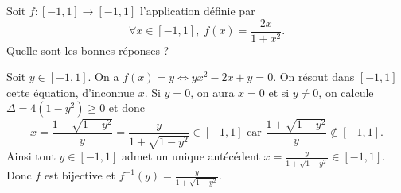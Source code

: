 \begin{question}
Soit $f:[-1,1]\to [-1,1]$ l'application définie par
$$\forall x\in [-1,1],\; f(x)=\frac{2x}{1+x^2}.$$
Quelle sont les bonnes réponses ?
\begin{answers}  
\end{answers}
\begin{explanations}
Soit $y\in [-1,1]$. On a $\displaystyle f(x)=y\Leftrightarrow yx^2-2x+y=0$. On résout dans $[-1,1]$ cette équation, d'inconnue $x$. Si $y=0$, on aura $x=0$ et si $y\neq 0$, on calcule $\Delta =4(1-y^2)\geq 0$ et donc
$$x=\frac{1-\sqrt{1-y^2}}{y}=\frac{y}{1+\sqrt{1-y^2}}\in [-1,1]\mbox{ car }\frac{1+\sqrt{1-y^2}}{y}\notin [-1,1].$$
Ainsi tout $y\in [-1,1]$ admet un unique antécédent $\displaystyle x=\frac{y}{1+\sqrt{1-y^2}}\in [-1,1]$. Donc $f$ est bijective et $\displaystyle f^{-1}(y)=\frac{y}{1+\sqrt{1-y^2}}$.
\end{explanations}
\end{question}